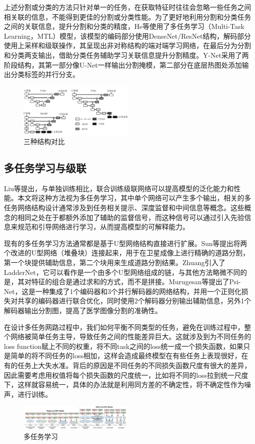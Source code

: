 \documentclass[journal,twoside,web]{ieeecolor}
\begin{document}
上述分割或分类的方法只针对单一的任务，在获取特征时往往会忽略一些任务之间相关联的信息，不能得到更佳的分割或分类性能。为了更好地利用分割和分类任务之间的关联信息，提升分割和分类的精度，He等使用了多任务学习（Multi-Task Learning，MTL）模型，该模型的编码部分使用DenseNet/ResNet结构，解码部分使用上采样和级联操作，其呈现出非对称结构的端对端学习网络，在最后分为分割和分类两支输出，借助分类任务辅助学习关联信息提升分割精度。Y-Net采用了两阶段结构，其第一部分像U-Net一样输出分割掩模，第二部分在底层热图处添加输出分类标签的并行分支。
\begin{figure}[h]
\centering
\includegraphics[width=0.5\textwidth]{img/fig13.jpg}
\caption{三种结构对比}
\label{fig:multi-task learning}
\end{figure}
\subsection{多任务学习与级联}

Liu等提出，与单独训练相比，联合训练级联网络可以提高模型的泛化能力和性能。本文将这种方法视为多任务学习，其中单个网络可以产生多个输出，相关的多任务网络结构设计通常涉及到任务相关提示、深度监督和中间信息等概念。这些概念的相同之处在于都额外添加了辅助的监督信号，而这种信号可以通过引入先验信息来规范和引导网络进行学习，从而提高模型的可解释能力。

现有的多任务学习方法通常都是基于U型网络结构直接进行扩展。Sun等提出将两个改进的U型网络（堆叠块）连接起来，用于在卫星成像上进行精确的道路分割，第一个块提供辅助信息，第二个块用来生成道路分割结果。Zhuang引入了LadderNet，它可以看作是一个由多个U型网络组成的链，与其他方法略微不同的是，其对特征的组合是通过求和的方式，而不是拼接。Murugesan等提出了Psi-Net，这是一种集成了1个编码器和3个并行解码器的网络结构，并用一个正则化损失对共享的编码器进行联合优化，同时使用2个解码器分别输出辅助信息，另外1个解码器输出分割图，提高了医学图像分割的准确性。

在设计多任务网路过程中，我们如何平衡不同类型的任务，避免在训练过程中，整个网络被简单任务主导，导致任务之间的性能差异巨大。这就涉及到为不同任务的loss function赋上不同的权重，将不同task之间的loss统一成一个损失函数，如果只是简单的将不同任务的loss相加，这样会造成最终模型在有些任务上表现很好，在有的任务上大失水准。背后的原因是不同任务的不同损失函数尺度有很大的差异，因此需要考虑用权值将每个损失函数的尺度统一，比如将不同的loss拉到统一尺度下，这样就容易统一，具体的办法就是利用同方差的不确定性，将不确定性作为噪声，进行训练。
\begin{figure}[h]
\centering
\includegraphics[width=0.5\textwidth]{img/fig14.png}
\caption{多任务学习}
\label{fig:multi-task learning}
\end{figure}
\end{document}
